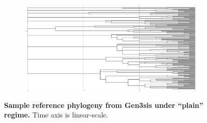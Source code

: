 \begin{figure}
\centering
\begin{subfigure}[b]{0.46\textwidth}
\includegraphics[height=0.12\textheight,width=\textwidth]{img/gen3sis-species/model=gen3sis+taxon=species+treatment=plain+seed=1+phylogeny-snapshot-100000.pdf}
  \end{subfigure}
  \caption{%
    \textbf{Sample reference phylogeny from Gen3sis under ``plain'' regime.}
    Time axis is linear-scale.
  }
  \label{fig:perfect-tree-phylogeny-gen3sis}
\end{figure}
